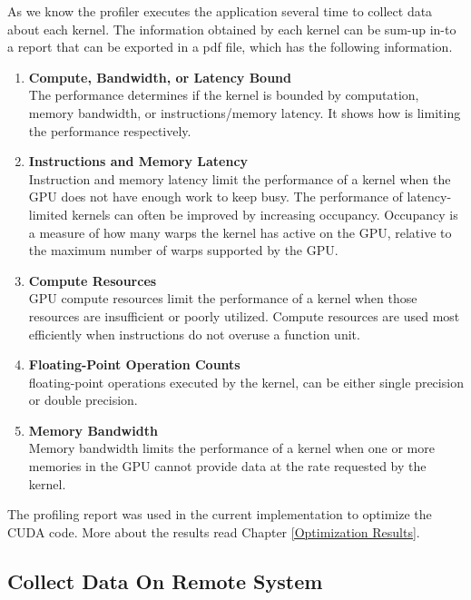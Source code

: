 As we know the profiler executes the application several time to collect data about each kernel. The information obtained by each kernel can be sum-up in-to a report that can be exported in a pdf file, which has the following information.

\begin{enumerate}
  \item \textbf{Compute, Bandwidth, or Latency Bound} \hfill \\
      The performance determines if the kernel is bounded by computation, memory bandwidth, or instructions/memory latency. It shows how is limiting the performance respectively.
  
  \item \textbf{Instructions and Memory Latency} \hfill \\
Instruction and memory latency limit the performance of a kernel when the GPU does not have enough work to keep busy. The performance of latency-limited kernels can often be improved by increasing occupancy. Occupancy is a measure of how many warps the kernel has active on the GPU, relative to the maximum number of warps supported by the GPU.
  
  \item \textbf{Compute Resources} \hfill \\
GPU compute resources limit the performance of a kernel when those resources are insufficient or poorly utilized. Compute resources are used most efficiently when instructions do not overuse a function unit. 
  \item \textbf{Floating-Point Operation Counts} \hfill \\
  floating-point operations executed by the kernel, can be either single precision or double precision.
  
  \item \textbf{Memory Bandwidth} \hfill \\
  Memory bandwidth limits the performance of a kernel when one or more memories in the GPU cannot provide data at the rate requested by the kernel.
\end{enumerate}

The profiling report was used in the current implementation to optimize the CUDA code. More about the results read Chapter \ref{Optimization Results}.

\subsection{Collect Data On Remote System}


